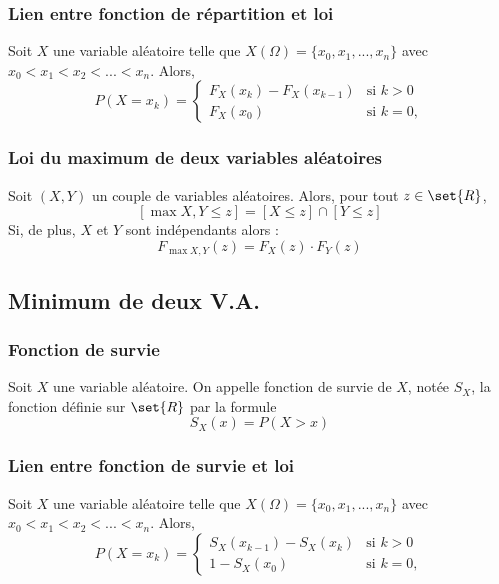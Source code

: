         \subsubsection{Lien entre fonction de répartition et loi}
            Soit $X$ une variable aléatoire telle que $X(\Omega) = \{x_0, x_1, ..., x_n\}$ avec 
            $x_0 < x_1 < x_2 < ... < x_n$. Alors, 
            \[
                P(X = x_k) = \begin{cases}
                F_X(x_k) - F_X(x_{k-1}) & \text{si } k > 0\\
                F_X(x_0)  & \text{si } k = 0,
                \end{cases}
            \]

        \subsubsection{Loi du maximum de deux variables aléatoires}
            Soit $(X, Y)$ un couple de variables aléatoires. Alors, pour tout $z \in \set{R}$,
            \[
                [\max{X,Y} \leq z] = [X \leq z] \cap [Y \leq z] 
            \]
            Si, de plus, $X$ et $Y$ sont indépendants alors :
            \[
                F_{\max{X,Y}}(z) = F_X(z) \cdot F_Y(z) 
            \]
    
    \subsection{Minimum de deux V.A.}

        \subsubsection{Fonction de survie}
            Soit $X$ une variable aléatoire. On appelle fonction de survie de $X$,
            notée $S_X$, la fonction définie sur $\set{R}$ par la formule
            \[
                S_X(x) = P(X > x)
            \]  

        \subsubsection{Lien entre fonction de survie et loi}
            Soit $X$ une variable aléatoire telle que $X(\Omega) = \{x_0, x_1, ..., x_n\}$ avec 
            $x_0 < x_1 < x_2 < ... < x_n$. Alors, 
            \[
                P(X = x_k) = \begin{cases}
                S_X(x_{k-1}) - S_X(x_k) & \text{si } k > 0\\
                1 - S_X(x_0)  & \text{si } k = 0,
                \end{cases}
            \]

